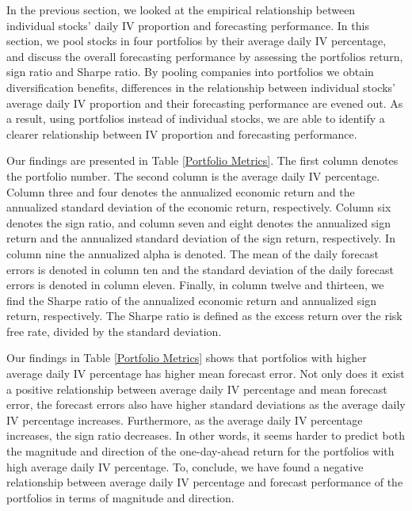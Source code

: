 In the previous section, we looked at the empirical relationship between individual stocks' daily IV proportion and forecasting performance. In this section, we pool stocks in four portfolios by their average daily IV percentage, and discuss the overall forecasting performance by assessing the portfolios return, sign ratio and Sharpe ratio. By pooling companies into portfolios we obtain diversification benefits, differences in the relationship between individual stocks' average daily IV proportion and their forecasting performance are evened out. As a result, using portfolios instead of individual stocks, we are able to identify a clearer relationship between IV proportion and forecasting performance. 

Our findings are presented in Table \ref{Portfolio Metrics}. The first column denotes the portfolio number. The second column is the average daily IV percentage. Column three and four denotes the annualized economic return and the annualized standard deviation of the economic return, respectively. Column six denotes the sign ratio, and column seven and eight denotes the annualized sign return and the annualized standard deviation of the sign return, respectively. In column nine the annualized alpha is denoted. The mean of the daily forecast errors is denoted in column ten and the standard deviation of the daily forecast errors is denoted in column eleven. Finally, in column twelve and thirteen, we find the Sharpe ratio of the annualized economic return and annualized sign return, respectively. The Sharpe ratio is defined as the excess return over the risk free rate, divided by the standard deviation.

Our findings in Table \ref{Portfolio Metrics} shows that portfolios with higher average daily IV percentage has higher mean forecast error. Not only does it exist a positive relationship between average daily IV percentage and mean forecast error, the forecast errors also have higher standard deviations as the average daily IV percentage increases. Furthermore, as the average daily IV percentage increases, the sign ratio decreases. In other words, it seems harder to predict both the magnitude and direction of the one-day-ahead return for the portfolios with high average daily IV percentage. To, conclude, we have found a negative relationship between average daily IV percentage and forecast performance of the portfolios in terms of magnitude and direction. 

